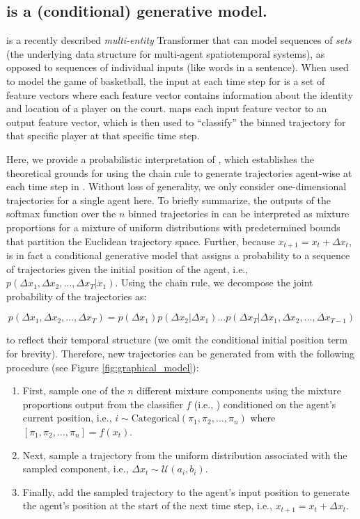 \subsection{\btv{} is a (conditional) generative model.}\label{sec:baller2vec_generative}

\btv{} is a recently described \textit{multi-entity} Transformer that can model sequences of \textit{sets} (the underlying data structure for multi-agent spatiotemporal systems), as opposed to sequences of individual inputs (like words in a sentence).
When used to model the game of basketball, the input at each time step for \btv{} is a set of feature vectors where each feature vector contains information about the identity and location of a player on the court.
\btv{} maps each input feature vector to an output feature vector, which is then used to ``classify'' the binned trajectory for that specific player at that specific time step.

Here, we provide a probabilistic interpretation of \btv{}, which establishes the theoretical grounds for using the chain rule to generate trajectories agent-wise at each time step in \btvpp{}.
Without loss of generality, we only consider one-dimensional trajectories for a single agent here.
To briefly summarize, the outputs of the softmax function over the $n$ binned trajectories in \btv{} can be interpreted as mixture proportions for a mixture of uniform distributions with predetermined bounds that partition the Euclidean trajectory space.
Further, because $x_{t + 1} = x_{t} + \Delta x_{t}$, \btv{} is in fact a conditional generative model that assigns a probability to a sequence of trajectories given the initial position of the agent, i.e., $p(\Delta x_{1}, \Delta x_{2}, \dots, \Delta x_{T} | x_{1})$.
Using the chain rule, we decompose the joint probability of the trajectories as:

\[
    p(\Delta x_{1}, \Delta x_{2}, \dots, \Delta x_{T}) = p(\Delta x_{1}) p(\Delta x_{2} | \Delta x_{1}) \dots p(\Delta x_{T} | \Delta x_{1}, \Delta x_{2}, \dots, \Delta x_{T - 1})
\]

\noindent
to reflect their temporal structure (we omit the conditional initial position term for brevity).
Therefore, new trajectories can be generated from \btv{} with the following procedure (see Figure \ref{fig:graphical_model}):

\begin{enumerate}
    \item First, sample one of the $n$ different mixture components using the mixture proportions output from the classifier $f$ (i.e., \btv{}) conditioned on the agent's current position, i.e., $i \sim \text{Categorical}(\pi_{1}, \pi_{2}, \dots, \pi_{n})$ where $[\pi_{1}, \pi_{2}, \dots, \pi_{n}] = f(x_{t})$.
    \item Next, sample a trajectory from the uniform distribution associated with the sampled component, i.e., $\Delta x_{t} \sim \mathcal{U}(a_{i}, b_{i})$.
    \item Finally, add the sampled trajectory to the agent's input position to generate the agent's position at the start of the next time step, i.e., $x_{t+1} = x_{t} + \Delta x_{t}$.
\end{enumerate}

